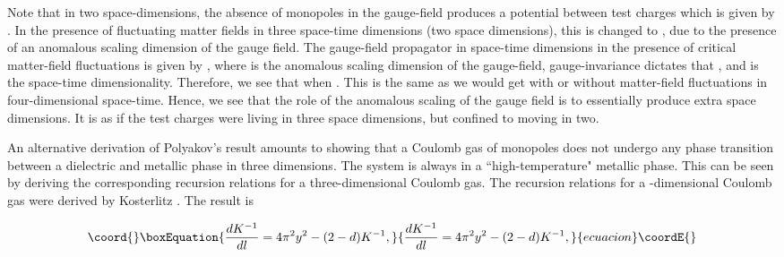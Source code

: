 \documentclass[a4paper,showpacs,preprintnumbers,amsmath,amssymb,prl,twocolumn]{revtex4}
\begin{document}
Note that in two space-dimensions, the absence of monopoles in the 
gauge-field produces a potential between test charges which is given 
by \coordHE{}.  In the presence of fluctuating matter fields 
in three space-time dimensions (two space dimensions), this  is 
changed to \coordHE{}, due to the presence of an anomalous 
scaling dimension of the gauge field. The gauge-field propagator in 
\coordHE{} space-time dimensions in the presence of critical matter-field 
fluctuations is given by \coordHE{}, where 
\coordHE{} is the anomalous scaling dimension of the gauge-field,
gauge-invariance dictates that \coordHE{} \cite{Herbut}, and 
\coordHE{} is the space-time dimensionality. Therefore, we see that 
\coordHE{} when \myHighlight{$d \in (2,4]$}\coordHE{}. This is the same as we would 
get with or without matter-field fluctuations in four-dimensional 
space-time. 
Hence, we see that the role of the anomalous scaling of the gauge 
field is to essentially produce extra space dimensions. It is as if the  
test charges were living in three space dimensions, but confined to 
moving in two.
 
An alternative derivation of Polyakov's result amounts to showing that a 
Coulomb gas of monopoles does not undergo any phase transition between a 
dielectric and metallic phase in three dimensions.  The system is always 
in a ``high-temperature" metallic phase. This can be seen by deriving the 
corresponding recursion relations for a three-dimensional Coulomb gas. The 
recursion relations for a \coordHE{}-dimensional Coulomb gas were derived by 
Kosterlitz \cite{Kosterlitz}. The result is

\begin{equation}\coord{}\boxEquation{
\label{flowK}
\frac{d K^{-1}}{dl}=4\pi^2 y^2-(2-d)K^{-1},
}{
\frac{d K^{-1}}{dl}=4\pi^2 y^2-(2-d)K^{-1},
}{ecuacion}\coordE{}\end{equation}
\end{document}
